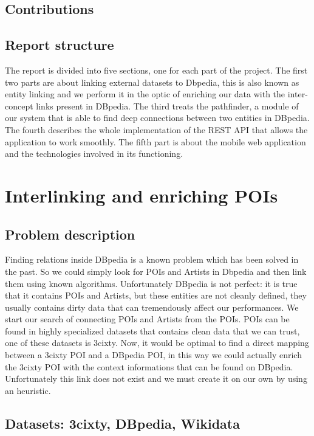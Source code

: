 \subsection{Contributions}

\subsection{Report structure}
The report is divided into five sections, one for each part of the project. The first two parts are about linking external datasets to Dbpedia, this is also known as entity linking and we perform it in the optic of enriching our data with the inter-concept links present in DBpedia.
The third treats the pathfinder, a module of our system that is able to find deep connections between two entities in DBpedia.
The fourth describes the whole implementation of the REST API that allows the application to work smoothly.
The fifth part is about the mobile web application and the technologies involved in its functioning.

\section{Interlinking and enriching POIs}
\subsection{Problem description}
Finding relations inside DBpedia is a known problem which has been solved in the past. So we could simply look for POIs and Artists in Dbpedia and then link them using known algorithms.
Unfortunately DBpedia is not perfect: it is true that it contains POIs and Artists, but these entities are not cleanly defined, they usually contains dirty data that can tremendously affect our performances.
We start our search of connecting POIs and Artists from the POIs. POIs can be found in highly specialized datasets that contains clean data that we can trust, one of these datasets is 3cixty. Now, it would be optimal to find a direct mapping between a 3cixty POI and a DBpedia POI, in this way we could actually enrich the 3cixty POI with the context informations that can be found on DBpedia. Unfortunately this link does not exist and we must create it on our own by using an heuristic.

\subsection{Datasets: 3cixty, DBpedia, Wikidata}
